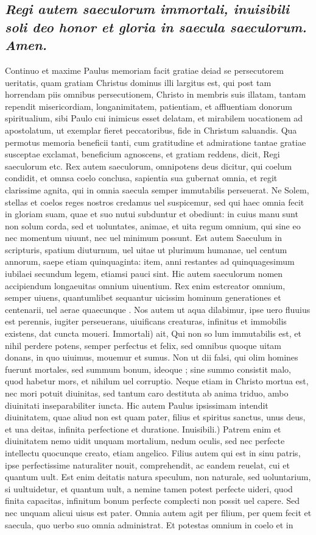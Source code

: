 \documentclass{article}
\begin{document}
\begin{pages}
\subsection*{\textit{Regi autem saeculorum immortali, inuisibili soli deo honor et gloria in saecula saeculorum. Amen. }}\pstart Continuo et maxime Paulus memoriam facit gratiae deiad se persecutorem ueritatis, quam gratiam Christus dominus illi largitus est, qui post tam horrendam piis omnibus persecutionem, Christo in membris suis illatam, tantam rependit misericordiam, longanimitatem, patientiam, et affluentiam donorum spiritualium, sibi Paulo cui inimicus esset delatam, et mirabilem uocationem ad apostolatum, ut exemplar fieret peccatoribus, fide in Christum saluandis. Qua permotus memoria beneficii tanti, cum gratitudine et admiratione tantae gratiae susceptae exclamat, beneficium agnoscens, et gratiam reddens, dicit, Regi saeculorum etc. Rex autem saeculorum, omnipotens deus dicitur, qui coelum condidit, et omnsa coelo conclusa, sapientia sua gubernat omnia, et regit clarissime agnita, qui in omnia saecula semper immutabilis perseuerat. Ne Solem, stellas et coelos reges nostros credamus uel suspicemur, sed qui haec omnia fecit in gloriam suam, quae et suo nutui subduntur et obediunt: in cuius manu sunt non solum corda, sed et uoluntates, animae, et uita regum omnium, qui sine eo nec momentum uiuunt, nec uel minimum possunt. Est autem Saeculum in scripturis, spatium diuturnum, uel uitae ut plurimum humanae, uel centum annorum, saepe etiam quinquaginta: item, anni restantes ad quinquagesimum iubilaei secundum legem, etiamsi pauci sint. Hic autem saeculorum nomen accipiendum longaeuitas omnium uiuentium. Rex enim estcreator omnium, semper uiuens, quantumlibet sequantur uicissim hominum generationes et centenarii, uel aerae quaecunque . Nos autem ut aqua dilabimur, ipse uero fluuius est perennis, iugiter perseuerans, uiuificans creaturas, infinitus et immobilis existens, dat cuncta moueri. Immortali) ait, Qui non so lum immutabilis est, et nihil perdere potens, semper perfectus et felix, sed omnibus quoque uitam donans, in quo uiuimus, mouemur et sumus. Non ut dii falsi, qui olim homines fuerunt mortales, sed summum bonum, ideoque ; sine summo consistit malo, quod habetur mors, et nihilum uel corruptio. Neque etiam in Christo mortua est, nec mori potuit diuinitas, sed tantum caro destituta ab anima triduo, ambo diuinitati inseparabiliter iuncta. Hic autem Paulus ipsissimam intendit diuinitatem, quae aliud non est quam pater, filius et spiritus sanctus, unus deus, et una deitas, infinita perfectione et duratione. Inuisibili.) Patrem enim et diuinitatem nemo uidit unquam mortalium, nedum oculis, sed nec perfecte intellectu quocunque creato, etiam angelico. Filius autem qui est in sinu patris, ipse perfectissime naturaliter nouit, comprehendit, ac eandem reuelat, cui et quantum uult. Est enim deitatis natura speculum, non naturale, sed uoluntarium, si uultuidetur, et quantum uult, a nemine tamen potest perfecte uideri, quod finita capacitas, infinitum bonum perfecte complecti non possit uel capere. Sed nec unquam alicui uisus est pater. Omnia autem agit per filium, per quem fecit et saecula, quo uerbo suo omnia administrat. Et potestas omnium in coelo et in 
\end{pages}
\end{document}
